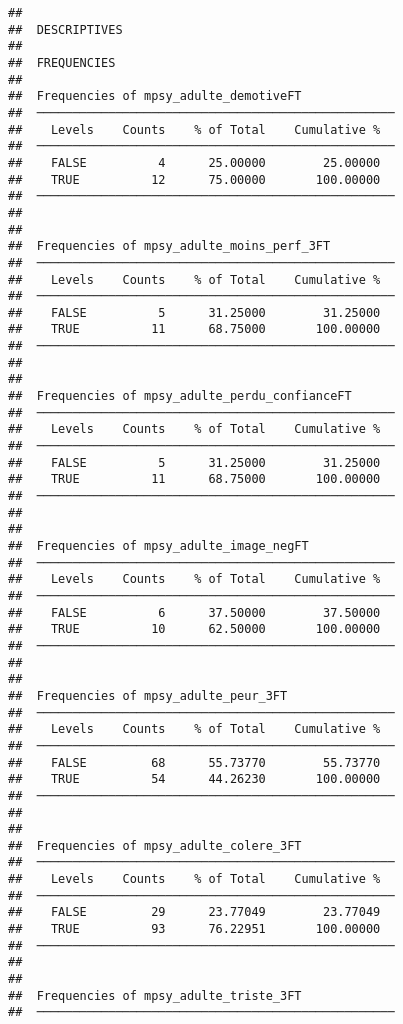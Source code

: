 \documentclass[
]{article}
\begin{document}
\begin{verbatim}
## 
##  DESCRIPTIVES
## 
##  FREQUENCIES
## 
##  Frequencies of mpsy_adulte_demotiveFT              
##  ────────────────────────────────────────────────── 
##    Levels    Counts    % of Total    Cumulative %   
##  ────────────────────────────────────────────────── 
##    FALSE          4      25.00000        25.00000   
##    TRUE          12      75.00000       100.00000   
##  ────────────────────────────────────────────────── 
## 
## 
##  Frequencies of mpsy_adulte_moins_perf_3FT          
##  ────────────────────────────────────────────────── 
##    Levels    Counts    % of Total    Cumulative %   
##  ────────────────────────────────────────────────── 
##    FALSE          5      31.25000        31.25000   
##    TRUE          11      68.75000       100.00000   
##  ────────────────────────────────────────────────── 
## 
## 
##  Frequencies of mpsy_adulte_perdu_confianceFT       
##  ────────────────────────────────────────────────── 
##    Levels    Counts    % of Total    Cumulative %   
##  ────────────────────────────────────────────────── 
##    FALSE          5      31.25000        31.25000   
##    TRUE          11      68.75000       100.00000   
##  ────────────────────────────────────────────────── 
## 
## 
##  Frequencies of mpsy_adulte_image_negFT             
##  ────────────────────────────────────────────────── 
##    Levels    Counts    % of Total    Cumulative %   
##  ────────────────────────────────────────────────── 
##    FALSE          6      37.50000        37.50000   
##    TRUE          10      62.50000       100.00000   
##  ────────────────────────────────────────────────── 
## 
## 
##  Frequencies of mpsy_adulte_peur_3FT                
##  ────────────────────────────────────────────────── 
##    Levels    Counts    % of Total    Cumulative %   
##  ────────────────────────────────────────────────── 
##    FALSE         68      55.73770        55.73770   
##    TRUE          54      44.26230       100.00000   
##  ────────────────────────────────────────────────── 
## 
## 
##  Frequencies of mpsy_adulte_colere_3FT              
##  ────────────────────────────────────────────────── 
##    Levels    Counts    % of Total    Cumulative %   
##  ────────────────────────────────────────────────── 
##    FALSE         29      23.77049        23.77049   
##    TRUE          93      76.22951       100.00000   
##  ────────────────────────────────────────────────── 
## 
## 
##  Frequencies of mpsy_adulte_triste_3FT              
##  ────────────────────────────────────────────────── 

\end{verbatim}
\end{document}
